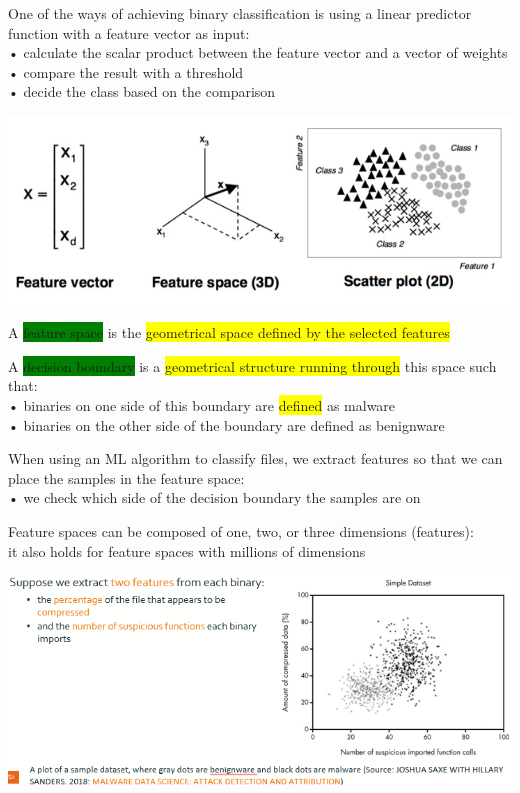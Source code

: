 \documentclass[]{project_plan}
\begin{document}
One of the ways of achieving binary classification is using a linear predictor function with a feature vector as input:\\
• calculate the scalar product between the feature vector and a vector of weights\\
• compare the result with a threshold\\
• decide the class based on the comparison

\includegraphics[width=.8\linewidth]{features .png}

A \colorbox{green}{feature space} is the \colorbox{yellow}{geometrical space defined by the selected features}

A \colorbox{green}{decision boundary} is a \colorbox{yellow}{geometrical structure running through} this space such that:\\
• binaries on one side of this boundary are \colorbox{yellow}{defined} as malware\\
• binaries on the other side of the boundary are defined as benignware

When using an ML algorithm to classify files, we extract features so that we can place the samples in the feature space:\\
• we check which side of the decision boundary the samples are on

Feature spaces can be composed of one, two, or three dimensions (features):\\
it also holds for feature spaces with millions of dimensions

\includegraphics[width=\linewidth]{Understanding Feature Spaces and Decision Boundaries.png}
\end{document}

